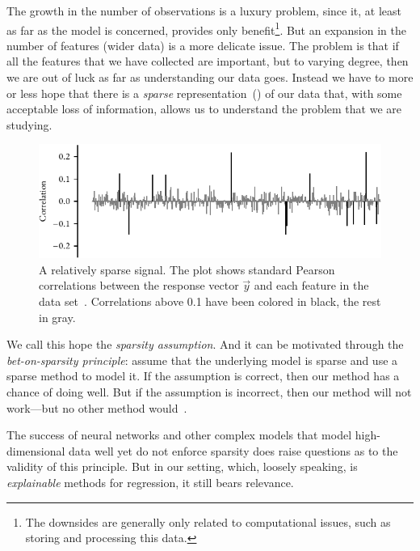 The growth in the number of observations is a luxury problem, since it, at least as far as the model is concerned, provides only benefit\footnote{The downsides are generally only related to computational issues, such as storing and processing this data.}. But an expansion in the number of features (wider data) is a more delicate issue. The problem is that if all the features that we have collected are important, but to varying degree, then we are out of luck as far as understanding our data goes. Instead we have to more or less hope that there is a \emph{sparse} representation~() of our data that, with some acceptable loss of information, allows us to understand the problem that we are studying.

\begin{figure}[htpb]
  \centering
  \includegraphics[]{figures/sparse-signal.pdf}
  \caption{%
    A relatively sparse signal. The plot shows standard Pearson correlations between the response vector \(\vec{y}\) and each feature in the  data set~\parencite{guyon2004}. Correlations above 0.1 have been colored in black, the rest in gray.
  }
  \label{fig:sparse-signal}
\end{figure}

We call this hope the \emph{sparsity assumption}. And it can be motivated through the \emph{bet-on-sparsity principle}: assume that the underlying model is sparse and use a sparse method to model it. If the assumption is correct, then our method has a chance of doing well. But if the assumption is incorrect, then our method will not work---but no other method would~\parencite{hastie2009}.

The success of neural networks and other complex models that model high-dimensional data well yet do not enforce sparsity does raise questions as to the validity of this principle. But in our setting, which, loosely speaking, is \emph{explainable} methods for regression, it still bears relevance.

